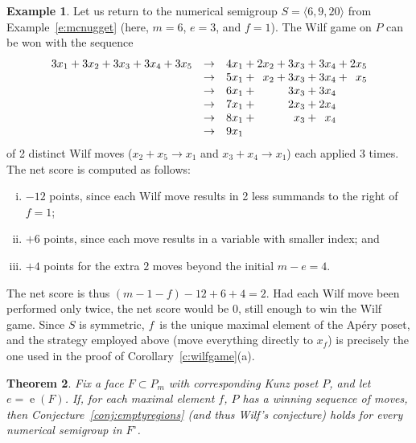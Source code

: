 \documentclass[12pt]{amsart}
\newtheorem{thm}{Theorem}[section]
\theoremstyle{definition}
\newtheorem{example}[thm]{Example}
\numberwithin{equation}{section}
\renewcommand\>{\rangle}
\newcommand\<{\langle}
\newcommand\0{\mathbf{0}}
\begin{document}
\begin{example}\label{e:wilfgame}
Let us return to the numerical semigroup $S = \<6, 9, 20\>$ from Example~\ref{e:mcnugget} (here, $m = 6$, $e = 3$, and $f = 1$).  The Wilf game on $P$ can be won with the sequence
$$\begin{array}{rcl@{}c@{}l@{}c@{}l@{}c@{}l@{}c@{}l}
3x_1 + 3x_2 + 3x_3 + 3x_4 + 3x_5
&\to& 4x_1 &{}+{}& 2x_2 &{}+{}& 3x_3 &{}+{}& 3x_4 &{}+{}& 2x_5 \\
&\to& 5x_1 &{}+{}& \phantom{1}x_2 &{}+{}& 3x_3 &{}+{}& 3x_4 &{}+{}& \phantom{1}x_5 \\
&\to& 6x_1 &{}+{}&  &{} {}& 3x_3 &{}+{}& 3x_4 &{} {}&  \\
&\to& 7x_1 &{}+{}&  &{} {}& 2x_3 &{}+{}& 2x_4 &{} {}&  \\
&\to& 8x_1 &{}+{}&  &{} {}& \phantom{1}x_3 &{}+{}& \phantom{1}x_4 &{} {}&  \\
&\to& 9x_1 &{} {}&  &{} {}&  &{} {}&  &{} {}&  \\
\end{array}$$
of 2 distinct Wilf moves ($x_2+x_5\to x_1$ and $x_3+x_4\to x_1$) each applied 3 times.  The net score is computed as follows:
\begin{enumerate}[(i)]
\item 
$-12$ points, since each Wilf move results in 2 less summands to the right of $f = 1$;

\item 
$+6$ points, since each move results in a variable with smaller index; and

\item 
$+4$ points for the extra $2$ moves beyond the initial $m - e = 4$.  

\end{enumerate}
The net score is thus $(m - 1 - f) - 12 + 6 + 4 = 2$.  Had each Wilf move been performed only twice, the net score would be $0$, still enough to win the Wilf game.  
Since $S$ is symmetric, $f$~is the unique maximal element of the Ap\'ery poset, and the strategy employed above (move everything directly to $x_f$) is precisely the one used in the proof of Corollary~\ref{c:wilfgame}(a).  
\end{example}

\begin{thm}\label{t:wilfgame}
Fix a face $F \subset P_m$ with corresponding Kunz poset $P$, and let $e = \operatorname{e}(F)$.  If, for each maximal element $f$, $P$ has a winning sequence of moves, then Conjecture~\ref{conj:emptyregions} (and thus Wilf's conjecture) holds for every numerical semigroup in $F^\circ$.  
\end{thm}
\end{document}
